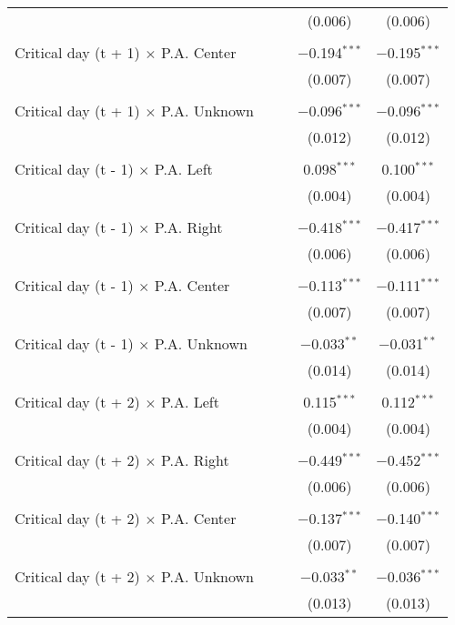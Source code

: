 \documentclass[
]{article}
\begin{document}
\begin{table}[!htbp]
{\begin{tabular}{@{\extracolsep{5pt}}lcccc}
  &  &  & (0.006) & (0.006) \\ 
  & & & & \\ 
 Critical day (t + 1) $\times$ P.A. Center &  &  & $-$0.194$^{***}$ & $-$0.195$^{***}$ \\ 
  &  &  & (0.007) & (0.007) \\ 
  & & & & \\ 
 Critical day (t + 1) $\times$ P.A. Unknown &  &  & $-$0.096$^{***}$ & $-$0.096$^{***}$ \\ 
  &  &  & (0.012) & (0.012) \\ 
  & & & & \\ 
 Critical day (t - 1) $\times$ P.A. Left &  &  & 0.098$^{***}$ & 0.100$^{***}$ \\ 
  &  &  & (0.004) & (0.004) \\ 
  & & & & \\ 
 Critical day (t - 1) $\times$ P.A. Right &  &  & $-$0.418$^{***}$ & $-$0.417$^{***}$ \\ 
  &  &  & (0.006) & (0.006) \\ 
  & & & & \\ 
 Critical day (t - 1) $\times$ P.A. Center &  &  & $-$0.113$^{***}$ & $-$0.111$^{***}$ \\ 
  &  &  & (0.007) & (0.007) \\ 
  & & & & \\ 
 Critical day (t - 1) $\times$ P.A. Unknown &  &  & $-$0.033$^{**}$ & $-$0.031$^{**}$ \\ 
  &  &  & (0.014) & (0.014) \\ 
  & & & & \\ 
 Critical day (t + 2) $\times$ P.A. Left &  &  & 0.115$^{***}$ & 0.112$^{***}$ \\ 
  &  &  & (0.004) & (0.004) \\ 
  & & & & \\ 
 Critical day (t + 2) $\times$ P.A. Right &  &  & $-$0.449$^{***}$ & $-$0.452$^{***}$ \\ 
  &  &  & (0.006) & (0.006) \\ 
  & & & & \\ 
 Critical day (t + 2) $\times$ P.A. Center &  &  & $-$0.137$^{***}$ & $-$0.140$^{***}$ \\ 
  &  &  & (0.007) & (0.007) \\ 
  & & & & \\ 
 Critical day (t + 2) $\times$ P.A. Unknown &  &  & $-$0.033$^{**}$ & $-$0.036$^{***}$ \\ 
  &  &  & (0.013) & (0.013) \\ 

\end{tabular}}
\end{table}
\end{document}
